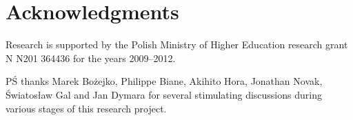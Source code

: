 \documentclass[12pt]{amsart}
\theoremstyle{plain}
\theoremstyle{remark}
\begin{document}
\section*{Acknowledgments}


Research is supported by the Polish Ministry of Higher Education research
grant N
N201 364436 for the years 2009--2012.

PŚ thanks Marek Bożejko, Philippe Biane,
Akihito Hora, Jonathan Novak,
Światosław Gal and Jan Dymara for several stimulating discussions during various
stages of this research project.



% 


\end{document}
